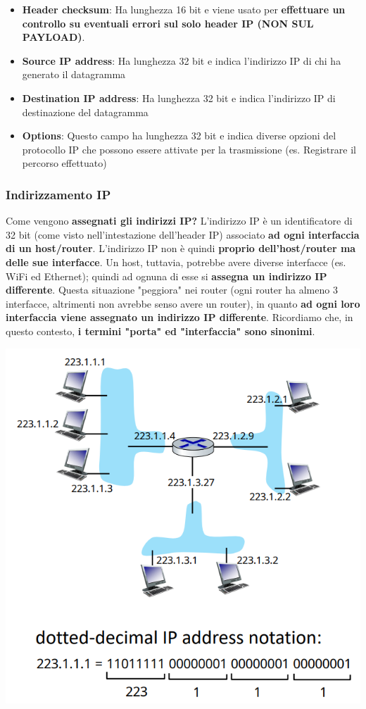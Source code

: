 \documentclass[12pt]{article}
\begin{document}
\begin{itemize}
    \item \textbf{Header checksum}: Ha lunghezza 16 bit e viene usato per \textbf{effettuare un controllo su eventuali errori sul solo header IP (NON SUL PAYLOAD)}.
    \item \textbf{Source IP address}: Ha lunghezza 32 bit e indica l'indirizzo IP di chi ha generato il datagramma
    \item \textbf{Destination IP address}: Ha lunghezza 32 bit e indica l'indirizzo IP di destinazione del datagramma
    \item \textbf{Options}: Questo campo ha lunghezza 32 bit e indica diverse opzioni del protocollo IP che possono essere attivate per la trasmissione (es. Registrare il percorso effettuato)
\end{itemize}

\subsubsection{Indirizzamento IP}
Come vengono \textbf{assegnati gli indirizzi IP?}
L'indirizzo IP è un identificatore di 32 bit (come visto nell'intestazione dell'header IP) associato \textbf{ad ogni interfaccia di un host/router}.
L'indirizzo IP non è quindi \textbf{proprio dell'host/router ma delle sue interfacce}. Un host, tuttavia, potrebbe avere diverse interfacce (es. WiFi ed Ethernet);
quindi ad ognuna di esse si \textbf{assegna un indirizzo IP differente}. Questa situazione "peggiora" nei router (ogni router ha almeno 3 interfacce, altrimenti non avrebbe senso avere un router), in quanto \textbf{ad ogni loro interfaccia viene assegnato un indirizzo IP differente}.
Ricordiamo che, in questo contesto, \textbf{i termini "porta" ed "interfaccia" sono sinonimi}. 
\begin{center}
    \includegraphics[width = 0.60\linewidth]{Images/83.png}
\end{center}
\end{document}
